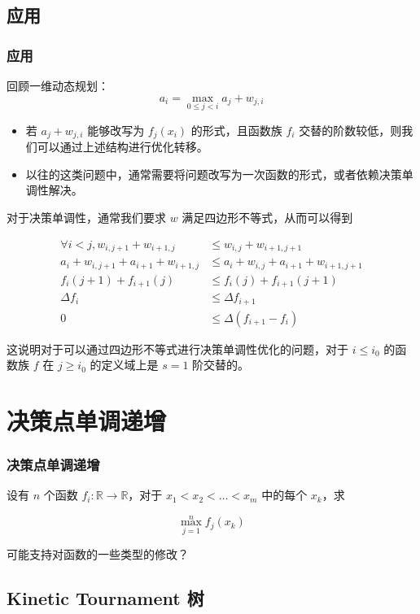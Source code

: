 \documentclass[mathserif]{ctexbeamer}
\begin{document}
\subsection{应用}
\frame
{
  \frametitle{应用}

  回顾一维动态规划：  
$$
a_i = \max_{0\le j < i} a_j + w_{j,i}
$$

\begin{itemize}
\item<1->若 $a_j + w_{j, i}$ 能够改写为 $f_j(x_i)$ 的形式，且函数族 $f_i$ 交替的阶数较低，则我们可以通过上述结构进行优化转移。

\item<2->以往的这类问题中，通常需要将问题改写为一次函数的形式，或者依赖决策单调性解决。
\end{itemize}
}

\frame
{
  对于决策单调性，通常我们要求 $w$ 满足四边形不等式，从而可以得到

\begin{align*}
\forall i < j, w_{i,j+1} + w_{i+1, j} & \le w_{i,j} + w_{i+1,j+1} \\
a_i + w_{i,j+1} + a_{i+1} + w_{i+1, j} & \le a_i + w_{i,j} + a_{i+1} + w_{i+1,j+1} \\
f_i(j+1) + f_{i+1}(j) & \le f_i(j) + f_{i+1}(j + 1)\\
\Delta f_i & \le \Delta f_{i+1} \\
0 &\le \Delta (f_{i + 1} - f_i)
\end{align*}

这说明对于可以通过四边形不等式进行决策单调性优化的问题，对于 $i\le i_0$ 的函数族 $f$ 在 $j \ge i_0$ 的定义域上是 $s=1$ 阶交替的。
}

\section{决策点单调递增}

\frame
{
\frametitle{决策点单调递增}

设有 $n$ 个函数 $f_i : \mathbb R \rightarrow \mathbb R$，对于 $x_1 < x_2 < \dots < x_m$ 中的每个 $x_k$，求

$$
\max_{j=1}^n f_j(x_k)
$$

可能支持对函数的一些类型的修改？
}

\subsection{Kinetic Tournament 树}
\end{document}
